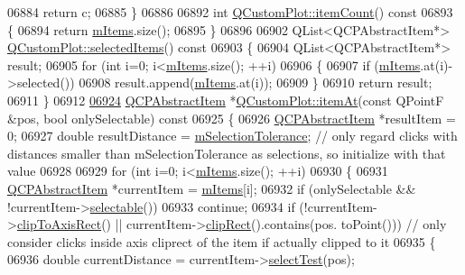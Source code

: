 \begin{DoxyCode}
06884   \textcolor{keywordflow}{return} c;
06885 \}
06886 
06892 \textcolor{keywordtype}{int} \hyperlink{a00116_a7ec4c2b995ae77fc3ecade97c42c52e0}{QCustomPlot::itemCount}()\textcolor{keyword}{ const}
06893 \textcolor{keyword}{}\{
06894   \textcolor{keywordflow}{return} \hyperlink{a00116_a6fcfff6ea3ccabcac8818943adb79a72}{mItems}.size();
06895 \}
06896 
06902 QList<QCPAbstractItem*> \hyperlink{a00116_a3714adb0a26b8cf1bd70740a7ea464c4}{QCustomPlot::selectedItems}()\textcolor{keyword}{ const}
06903 \textcolor{keyword}{}\{
06904   QList<QCPAbstractItem*> result;
06905   \textcolor{keywordflow}{for} (\textcolor{keywordtype}{int} i=0; i<\hyperlink{a00116_a6fcfff6ea3ccabcac8818943adb79a72}{mItems}.size(); ++i)
06906   \{
06907     \textcolor{keywordflow}{if} (\hyperlink{a00116_a6fcfff6ea3ccabcac8818943adb79a72}{mItems}.at(i)->selected())
06908       result.append(\hyperlink{a00116_a6fcfff6ea3ccabcac8818943adb79a72}{mItems}.at(i));
06909   \}
06910   \textcolor{keywordflow}{return} result;
06911 \}
06912 
\hypertarget{a00115_source_l06924}{}\hyperlink{a00116_a793e4b04e0ede11a733021907368fa83}{06924} \hyperlink{a00022}{QCPAbstractItem} *\hyperlink{a00116_a793e4b04e0ede11a733021907368fa83}{QCustomPlot::itemAt}(\textcolor{keyword}{const} QPointF &pos, \textcolor{keywordtype}{bool} 
      onlySelectable)\textcolor{keyword}{ const}
06925 \textcolor{keyword}{}\{
06926   \hyperlink{a00022}{QCPAbstractItem} *resultItem = 0;
06927   \textcolor{keywordtype}{double} resultDistance = \hyperlink{a00116_a6694031fcdb13682d098f5d21da86f97}{mSelectionTolerance}; \textcolor{comment}{// only regard clicks with distances
       smaller than mSelectionTolerance as selections, so initialize with that value}
06928   
06929   \textcolor{keywordflow}{for} (\textcolor{keywordtype}{int} i=0; i<\hyperlink{a00116_a6fcfff6ea3ccabcac8818943adb79a72}{mItems}.size(); ++i)
06930   \{
06931     \hyperlink{a00022}{QCPAbstractItem} *currentItem = \hyperlink{a00116_a6fcfff6ea3ccabcac8818943adb79a72}{mItems}[i];
06932     \textcolor{keywordflow}{if} (onlySelectable && !currentItem->\hyperlink{a00022_a9189e752025533e1595eaade0009a3bc}{selectable}())
06933       \textcolor{keywordflow}{continue};
06934     \textcolor{keywordflow}{if} (!currentItem->\hyperlink{a00022_a5b0ea171823033bcb8aee81f4a034871}{clipToAxisRect}() || currentItem->\hyperlink{a00022_a538e25ff8856534582f5b2b400a46405}{clipRect}().contains(pos.
      toPoint())) \textcolor{comment}{// only consider clicks inside axis cliprect of the item if actually clipped to it}
06935     \{
06936       \textcolor{keywordtype}{double} currentDistance = currentItem->\hyperlink{a00022_a2e19e88f67f4ba9c13b7e33bd447c075}{selectTest}(pos);

\end{DoxyCode}
